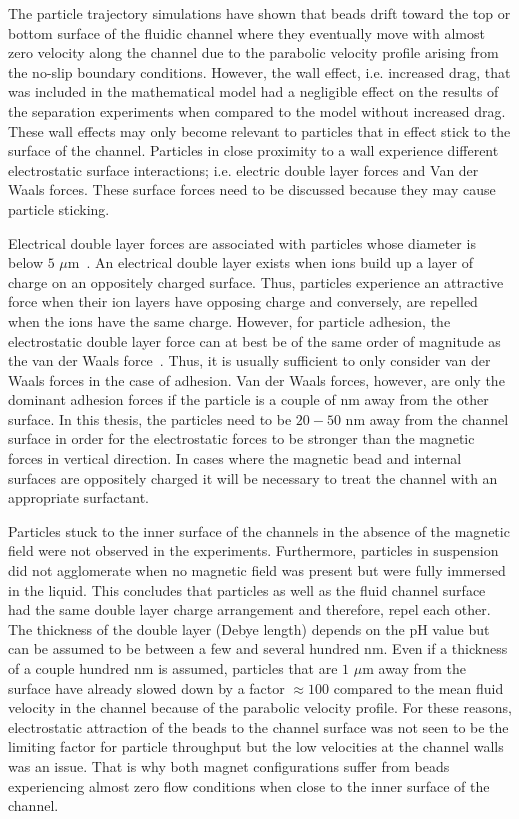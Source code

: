 The particle trajectory simulations have shown that beads drift toward the top or bottom surface of the fluidic channel where they eventually move with almost zero velocity along the channel due to the parabolic velocity profile arising from the no-slip boundary conditions. However, the wall effect, i.e. increased drag, that was included in the mathematical model had a negligible effect on the results of the separation experiments when compared to the model without increased drag. These wall effects may only become relevant to particles that in effect stick to the surface of the channel. Particles in close proximity to a wall experience different electrostatic surface interactions; i.e. electric double layer forces and Van der Waals forces. These surface forces need to be discussed because they may cause particle sticking. 

Electrical double layer forces are associated with particles whose diameter is below $5$ $\mu$m~\cite{bowling1988}. An electrical double layer exists when ions build up a layer of charge on an oppositely charged surface. Thus, particles experience an attractive force when their ion layers have opposing charge and conversely, are repelled when the ions have the same charge. However, for particle adhesion, the electrostatic double layer force can at best be of the same order of magnitude as the van der Waals force~\cite{Krupp1967}. Thus, it is usually sufficient to only consider van der Waals forces in the case of adhesion. Van der Waals forces, however, are only the dominant adhesion forces if the particle is a couple of nm away from the other surface. In this thesis, the particles need to be $20-50$ nm away from the channel surface in order for the electrostatic forces to be stronger than the magnetic forces in vertical direction. In cases where the magnetic bead and internal surfaces are oppositely charged it will be necessary to treat the channel with an appropriate surfactant.

Particles stuck to the inner surface of the channels in the absence of the magnetic field were not observed in the experiments. Furthermore, particles in suspension did not agglomerate when no magnetic field was present but were fully immersed in the liquid. This concludes that particles as well as the fluid channel surface had the same double layer charge arrangement and therefore, repel each other. The thickness of the double layer (Debye length) depends on the pH value but can be assumed to be between a few and several hundred nm. Even if a thickness of a couple hundred nm is assumed, particles that are $1$ $\mu$m away from the surface have already slowed down by a factor $\approx100$ compared to the mean fluid velocity in the channel because of the parabolic velocity profile. For these reasons, electrostatic attraction of the beads to the channel surface was not seen to be the limiting factor for particle throughput but the low velocities at the channel walls was an issue. That is why both magnet configurations suffer from beads experiencing almost zero flow conditions when close to the inner surface of the channel. 

